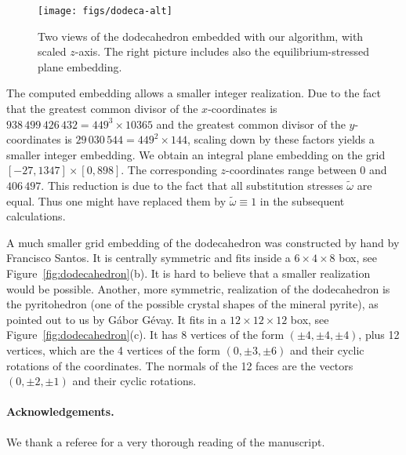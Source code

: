 \documentclass{article}
\theoremstyle{plain} \newtheorem{thm}{Theorem}[section]
\newcommand{\ot}{\tilde{\omega}}
\begin{document}
\begin{figure}[htb]
 \center 
\texttt{[image: figs/dodeca-alt]} 
    \caption{Two views of the dodecahedron embedded with our algorithm, with scaled $z$-axis.
      The right picture includes also the equilibrium-stressed plane embedding.}
    \label{fig:dodecaresult}
\end{figure}

The computed embedding allows a smaller integer realization. Due to
the fact that the greatest common divisor of the $x$-coordinates is
$938\,499\,426\,432=449^3\times 10365$ and the greatest common divisor
of the $y$-coordinates is $29\,030\,544=449^2\times 144$, scaling down
by these factors yields a smaller integer embedding. We obtain an
integral plane embedding on the grid $[-27,1347]\times[0,898]$.  The
corresponding $z$-coordinates range between 0 and $406\,497$.  This
reduction is due to the fact that all substitution stresses $\ot$ are
equal. Thus one might have replaced them by $\ot\equiv 1$ in the subsequent calculations.


A much smaller grid embedding of the dodecahedron was constructed by hand by
Francisco Santos.
It is centrally symmetric and fits inside a $6\times 4 \times 8$
box, see Figure~\ref{fig:dodecahedron}(b).
It is hard to believe that a smaller realization would be possible.
Another, more symmetric, realization of the dodecahedron is the
pyritohedron (one of the possible crystal shapes of the mineral
pyrite), as pointed out to us by G\'abor G\'evay.  It fits in a
$12\times12\times12$ box, see Figure~\ref{fig:dodecahedron}(c).  It has 8 vertices of the form
$(\pm4,\pm4,\pm4)$, plus 12 vertices, which are the 4 vertices of the form
$(0,\pm3,\pm6)$ and their cyclic rotations of the coordinates.  The
normals of the 12 faces are the vectors $(0,\pm2,\pm1)$ and their
cyclic rotations.

\paragraph{
Acknowledgements.}
We thank a referee for a very thorough reading of the manuscript.



\end{document}
